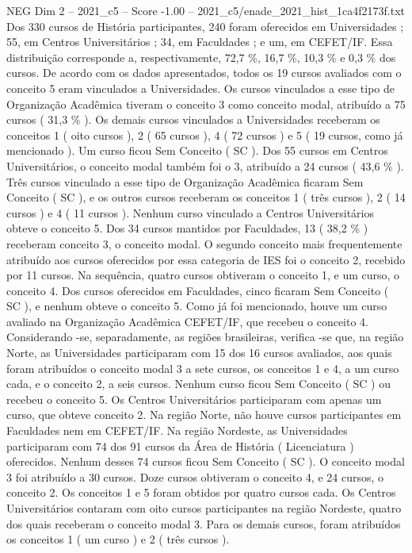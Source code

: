 \begin{textsample}{NEG Dim 2 – 2021\_c5 – Score -1.00 – 2021\_c5/enade\_2021\_hist\_1ca4f2173f.txt}
Dos 330 cursos de História participantes, 240 foram oferecidos em Universidades ; 55, em Centros Universitários ; 34, em Faculdades ; e um, em CEFET/IF.
Essa distribuição corresponde a, respectivamente, 72,7 \%, 16,7 \%, 10,3 \% e 0,3 \% dos cursos.
De acordo com os dados apresentados, todos os 19 cursos avaliados com o conceito 5 eram vinculados a Universidades.
Os cursos vinculados a esse tipo de Organização Acadêmica tiveram o conceito 3 como conceito modal, atribuído a 75 cursos ( 31,3 \% ).
Os demais cursos vinculados a Universidades receberam os conceitos 1 ( oito cursos ), 2 ( 65 cursos ), 4 ( 72 cursos ) e 5 ( 19 cursos, como já mencionado ).
Um curso ficou Sem Conceito ( SC ).
Dos 55 cursos em Centros Universitários, o conceito modal também foi o 3, atribuído a 24 cursos ( 43,6 \% ).
Três cursos vinculado a esse tipo de Organização Acadêmica ficaram Sem Conceito ( SC ), e os outros cursos receberam os conceitos 1 ( três cursos ), 2 ( 14 cursos ) e 4 ( 11 cursos ).
Nenhum curso vinculado a Centros Universitários obteve o conceito 5.
Dos 34 cursos mantidos por Faculdades, 13 ( 38,2 \% ) receberam conceito 3, o conceito modal.
O segundo conceito mais frequentemente atribuído aos cursos oferecidos por essa categoria de IES foi o conceito 2, recebido por 11 cursos.
Na sequência, quatro cursos obtiveram o conceito 1, e um curso, o conceito 4.
Dos cursos oferecidos em Faculdades, cinco ficaram Sem Conceito ( SC ), e nenhum obteve o conceito 5.
Como já foi mencionado, houve um curso avaliado na Organização Acadêmica CEFET/IF, que recebeu o conceito 4.
Considerando -se, separadamente, as regiões brasileiras, verifica -se que, na região Norte, as Universidades participaram com 15 dos 16 cursos avaliados, aos quais foram atribuídos o conceito modal 3 a sete cursos, os conceitos 1 e 4, a um curso cada, e o conceito 2, a seis cursos.
Nenhum curso ficou Sem Conceito ( SC ) ou recebeu o conceito 5.
Os Centros Universitários participaram com apenas um curso, que obteve conceito 2.
Na região Norte, não houve cursos participantes em Faculdades nem em CEFET/IF.
Na região Nordeste, as Universidades participaram com 74 dos 91 cursos da Área de História ( Licenciatura ) oferecidos.
Nenhum desses 74 cursos ficou Sem Conceito ( SC ).
O conceito modal 3 foi atribuído a 30 cursos.
Doze cursos obtiveram o conceito 4, e 24 cursos, o conceito 2.
Os conceitos 1 e 5 foram obtidos por quatro cursos cada.
Os Centros Universitários contaram com oito cursos participantes na região Nordeste, quatro dos quais receberam o conceito modal 3.
Para os demais cursos, foram atribuídos os conceitos 1 ( um curso ) e 2 ( três cursos ).

\end{textsample}
